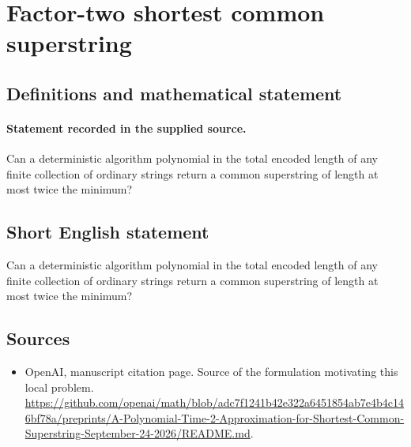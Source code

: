 \documentclass[11pt]{article}
\begin{document}
\section*{Factor-two shortest common superstring}\label{statement}
\subsection{Definitions and mathematical statement}
\paragraph{Statement recorded in the supplied source.}
Can a deterministic algorithm polynomial in the total encoded length of any finite collection of ordinary strings return a common superstring of length at most twice the minimum?
\subsection{Short English statement}
Can a deterministic algorithm polynomial in the total encoded length of any finite collection of ordinary strings return a common superstring of length at most twice the minimum?
\subsection{Sources}
\begin{itemize}
\item[S1] OpenAI, manuscript citation page. Source of the formulation motivating this local problem.
\url{https://github.com/openai/math/blob/adc7f1241b42e322a6451854ab7e4b4c146bf78a/preprints/A-Polynomial-Time-2-Approximation-for-Shortest-Common-Superstring-September-24-2026/README.md}.
\end{itemize}
\end{document}
